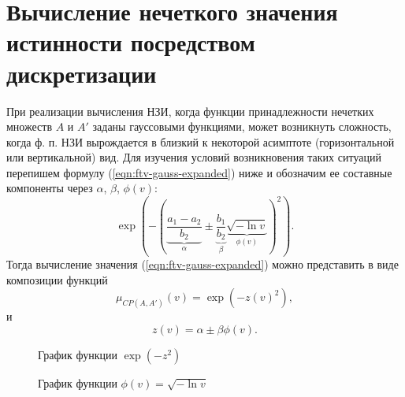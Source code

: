 \section{Вычисление нечеткого значения истинности посредством дискретизации}\label{sec:ch3/sect1}

При реализации вычисления НЗИ, когда функции принадлежности нечетких множеств $A$ и $A'$ заданы гауссовыми функциями, может возникнуть сложность, когда ф. п. НЗИ вырождается в близкий к некоторой асимптоте (горизонтальной или вертикальной) вид. Для изучения условий возникновения таких ситуаций перепишем формулу (\ref{eqn:ftv-gauss-expanded}) ниже и обозначим ее составные компоненты через $\alpha$, $\beta$, $\phi(v)$:
\begin{equation*}
	\exp\left(-\left(\underbrace{\frac{a_1-a_2}{b_2}}_{\alpha}\pm\underbrace{\frac{b_1}{b_2}}_{\beta}\underbrace{\sqrt{-\ln v}}_{\phi(v)}\right)^2\right).
	\label{eqn:ftv-gauss-components-markup}
\end{equation*}
Тогда вычисление значения (\ref{eqn:ftv-gauss-expanded}) можно представить в виде композиции функций
\begin{equation}
	\mu_{CP(A,A')}(v)=\exp(-z(v)^2),
	\label{eqn:ftv-gauss-exp-z}
\end{equation}
и
\begin{equation}
	z(v)=\alpha \pm \beta \phi(v).
	\label{eqn:ftv-gauss-phi}
\end{equation}



\begin{figure}[ht]
	\centering
	\begin{minipage}[t]{0.48\textwidth}
		\centering
		\caption{График функции $\exp(-z^2)$}
		\label{fig:ftv-exp-component}
	\end{minipage}
	\hfill
	\begin{minipage}[t]{0.48\textwidth}
		\centering
		\caption{График функции $\phi(v)=\sqrt{-\ln v}$}
		\label{fig:ftv-phi-component}
	\end{minipage}
\end{figure}

